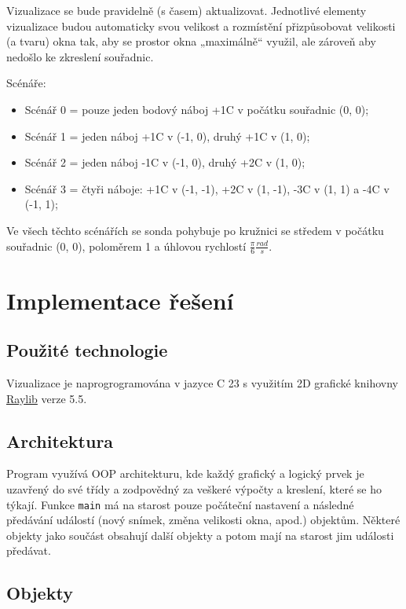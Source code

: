 \documentclass[12pt,a4paper]{paper}
\newcommand{\code}[1]{\texttt{#1}}
\def\CC{{C\nolinebreak[4]\hspace{-.05em}\raisebox{.4ex}{\tiny\bf ++}}}
\begin{document}
Vizualizace se bude pravidelně (s časem) aktualizovat. Jednotlivé elementy
vizualizace budou automaticky svou velikost a rozmístění přizpůsobovat velikosti
(a tvaru) okna tak, aby se prostor okna „maximálně“ využil, ale zároveň aby
nedošlo ke zkreslení souřadnic.

Scénáře:

\begin{itemize}
  \item Scénář 0 = pouze jeden bodový náboj +1C v počátku souřadnic (0, 0);
  \item Scénář 1 = jeden náboj +1C v (-1, 0), druhý +1C v (1, 0);
  \item Scénář 2 = jeden náboj -1C v (-1, 0), druhý +2C v (1, 0);
  \item Scénář 3 = čtyři náboje: +1C v (-1, -1), +2C v (1, -1), -3C v (1, 1)
    a -4C v (-1, 1);
\end{itemize}

Ve všech těchto scénářích se sonda pohybuje po kružnici se středem v počátku
souřadnic (0, 0), poloměrem 1 a úhlovou rychlostí \( \frac{\pi}{6}
\frac{rad}{s} \).

\section{Implementace řešení}

\subsection{Použité technologie}

Vizualizace je naprogrogramována v jazyce \CC{} 23 s využitím 2D grafické
knihovny \href{https://www.raylib.com/}{Raylib} verze 5.5.


\subsection{Architektura}

Program využívá OOP architekturu, kde každý grafický a logický prvek je uzavřený
do své třídy a zodpovědný za veškeré výpočty a kreslení, které se ho týkají.
Funkce \code{main} má na starost pouze počáteční nastavení a následné předávání
událostí (nový snímek, změna velikosti okna, apod.) objektům. Některé objekty
jako součást obsahují další objekty a potom mají na starost jim události
předávat.

\subsection{Objekty}
\end{document}
